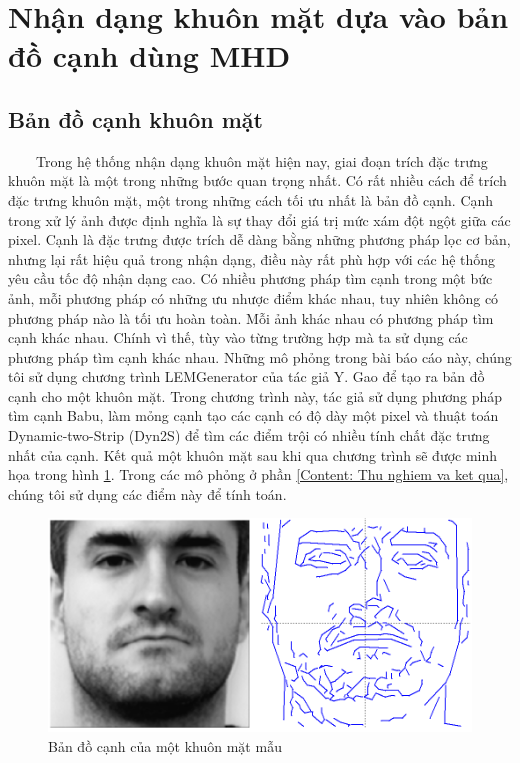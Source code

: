 \documentclass[runningheads]{llncs}
\begin{document}
\section{Nhận dạng khuôn mặt dựa vào bản đồ cạnh dùng MHD}
\label{Content: Gioi thieu nhan dang khuon mat dung MHD}

\subsection{Bản đồ cạnh khuôn mặt}
\label{ContentS: Ban do canh khuon mat}
~~~~Trong hệ thống nhận dạng khuôn mặt hiện nay, giai đoạn trích đặc trưng khuôn mặt là một trong những bước quan trọng nhất. Có rất nhiều cách để trích đặc trưng khuôn mặt, một trong những cách tối ưu nhất là bản đồ cạnh. Cạnh trong xử lý ảnh được định nghĩa là sự thay đổi giá trị mức xám đột ngột giữa các pixel. Cạnh là đặc trưng được trích dễ dàng bằng những phương pháp lọc cơ bản, nhưng lại rất hiệu quả trong nhận dạng, điều này rất phù hợp với các hệ thống yêu cầu tốc độ nhận dạng cao. Có nhiều phương pháp tìm cạnh trong một bức ảnh, mỗi phương pháp có những ưu nhược điểm khác nhau, tuy nhiên không có phương pháp nào là tối ưu hoàn toàn. Mỗi ảnh khác nhau có phương pháp tìm cạnh khác nhau. Chính vì thế, tùy vào từng trường hợp mà ta sử dụng các phương pháp tìm cạnh khác nhau. Những mô phỏng trong bài báo cáo này, chúng tôi sử dụng chương trình LEMGenerator của tác giả Y. Gao để tạo ra bản đồ cạnh cho một khuôn mặt. Trong chương trình này, tác giả sử dụng phương pháp tìm cạnh Babu, làm mỏng cạnh tạo các cạnh có độ dày một pixel và thuật toán Dynamic-two-Strip (Dyn2S) để tìm các điểm trội có nhiều tính chất đặc trưng nhất của cạnh. Kết quả một khuôn mặt sau khi qua chương trình sẽ được minh họa trong hình \ref{Fig: ban do canh}. Trong các mô phỏng ở phần \ref{Content: Thu nghiem va ket qua}, chúng tôi sử dụng các điểm này để tính toán.
\begin{figure}
\begin{center}
\includegraphics[scale=0.4]{figs/ban_do_canh.PNG}
\caption{Bản đồ cạnh của một khuôn mặt mẫu} \label{Fig: ban do canh}
\end{center}
\end{figure}
\end{document}
